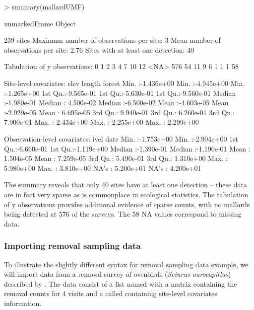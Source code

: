 \documentclass[article,shortnames]{jss}
\begin{document}
\begin{Schunk}
\begin{Sinput}
> summary(mallardUMF)
\end{Sinput}
\begin{Soutput}
unmarkedFrame Object

239 sites
Maximum number of observations per site: 3 
Mean number of observations per site: 2.76 
Sites with at least one detection: 40 

Tabulation of y observations:
   0    1    2    3    4    7   10   12 <NA> 
 576   54   11    9    6    1    1    1   58 

Site-level covariates:
      elev                length               forest          
 Min.   :-1.436e+00   Min.   :-4.945e+00   Min.   :-1.265e+00  
 1st Qu.:-9.565e-01   1st Qu.:-5.630e-01   1st Qu.:-9.560e-01  
 Median :-1.980e-01   Median : 4.500e-02   Median :-6.500e-02  
 Mean   :-4.603e-05   Mean   :-2.929e-05   Mean   : 6.695e-05  
 3rd Qu.: 9.940e-01   3rd Qu.: 6.260e-01   3rd Qu.: 7.900e-01  
 Max.   : 2.434e+00   Max.   : 2.255e+00   Max.   : 2.299e+00  

Observation-level covariates:
      ivel                 date           
 Min.   :-1.753e+00   Min.   :-2.904e+00  
 1st Qu.:-6.660e-01   1st Qu.:-1.119e+00  
 Median :-1.390e-01   Median :-1.190e-01  
 Mean   : 1.504e-05   Mean   : 7.259e-05  
 3rd Qu.: 5.490e-01   3rd Qu.: 1.310e+00  
 Max.   : 5.980e+00   Max.   : 3.810e+00  
 NA's   : 5.200e+01   NA's   : 4.200e+01  
\end{Soutput}
\end{Schunk}

The summary reveals that only 40 sites have at least one detection -- these 
data are in fact very sparse as is commonplace in ecological statistics. The 
tabulation of y observations provides additional evidence of sparse counts, 
with no mallards being detected at 576 of the surveys. The 58 NA values 
correspond to missing data. 


\subsubsection{Importing removal sampling data}

To illustrate the slightly different syntax for removal sampling data example, 
we will import data from a removal survey of ovenbirds 
({\it Seiurus aurocapillus}) described by \citet{Royle2004a}.  The data consist 
of a list named  with 
a matrix  containing the removal counts for 4 visits and a 
 called  containing site-level covariates 
information.
\end{document}
